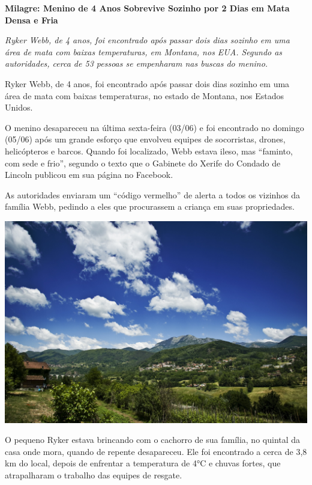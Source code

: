 \begin{myquote}
\textbf{Milagre: Menino de 4 Anos Sobrevive Sozinho por 2 Dias em Mata Densa e Fria}

\emph{Ryker Webb, de 4 anos, foi encontrado após passar dois dias
sozinho em uma área de mata com baixas temperaturas, em Montana, nos
EUA. Segundo as autoridades, cerca de 53 pessoas se empenharam nas
buscas do menino.}

Ryker Webb, de 4 anos, foi encontrado após passar dois dias sozinho em
uma área de mata com baixas temperaturas, no estado de Montana, nos
Estados Unidos.

O menino desapareceu na última sexta-feira (03/06) e foi encontrado no
domingo (05/06) após um grande esforço que envolveu equipes de
socorristas, drones, helicópteros e barcos. Quando foi localizado, Webb
estava ileso, mas ``faminto, com sede e frio'', segundo o texto que o
Gabinete do Xerife do Condado de Lincoln publicou em sua página no
Facebook.

As autoridades enviaram um ``código vermelho'' de alerta a todos os
vizinhos da família Webb, pedindo a eles que procurassem a criança em
suas propriedades.

\begin{center}
\noindent\includegraphics[width=\textwidth]{media/image20b.jpg}
\end{center}

O pequeno Ryker estava brincando com o cachorro de sua família, no
quintal da casa onde mora, quando de repente desapareceu. Ele foi
encontrado a cerca de 3,8 km do local, depois de enfrentar a temperatura
de 4°C e chuvas fortes, que atrapalharam o trabalho das equipes de
resgate.


\end{myquote}
